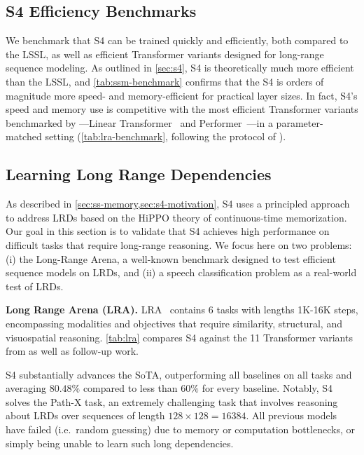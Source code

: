 \subsection{S4 Efficiency Benchmarks}
\label{sec:experiments-benchmark}
We benchmark that S4 can be trained quickly and efficiently, both compared to the LSSL, as well as efficient Transformer variants designed for long-range sequence modeling. As outlined in \ref{sec:s4}, S4 is theoretically much more efficient than the LSSL, and \ref{tab:ssm-benchmark} confirms that the S4 is orders of magnitude more speed- and memory-efficient for practical layer sizes. In fact, S4's speed and memory use is competitive with the most efficient Transformer variants benchmarked by \citet{tay2021long}---Linear Transformer~\citep{katharopoulos2020transformers} and Performer~\citep{choromanski2020rethinking}---in a parameter-matched setting (\ref{tab:lra-benchmark}, following the protocol of \citet{tay2021long}).

\subsection{Learning Long Range Dependencies}
\label{sec:experiments-lrd}
As described in \ref{sec:ss-memory,sec:s4-motivation}, S4 uses a principled approach to address LRDs based on the HiPPO theory of continuous-time memorization. Our goal in this section is to validate that S4 achieves high performance on difficult tasks that require long-range reasoning. We focus here on two problems: (i) the Long-Range Arena, a well-known benchmark designed to test efficient sequence models on LRDs, and (ii) a speech classification problem as a real-world test of LRDs.

\textbf{Long Range Arena (LRA).} LRA~\citep{tay2021long} contains $6$ tasks with lengths 1K-16K steps, encompassing modalities and objectives that require similarity, structural, and visuospatial reasoning.
\ref{tab:lra} compares S4 against the 11 Transformer variants from \citet{tay2021long} as well as follow-up work.

S4 substantially advances the SoTA, outperforming all baselines on all tasks and averaging $80.48\%$ compared to less than \( 60\% \) for every baseline. Notably, S4 solves the Path-X task, an extremely challenging task that involves reasoning about LRDs over sequences of length \( 128\times 128 = 16384 \).
All previous models have failed (i.e.\ random guessing) due to memory or computation bottlenecks, or simply being unable to learn such long dependencies.

